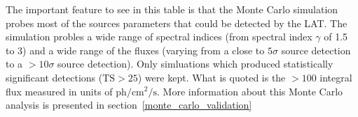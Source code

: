 \documentclass[12pt,preprint]{aastex}
\newcommand{\mev}{\text{MeV}\xspace}
\newcommand{\s}{\text{s}\xspace}
\newcommand{\ph}{\text{ph}\xspace}
\newcommand{\cm}{\text{cm}\xspace}
\newcommand{\ts}{\text{TS}\xspace}
\begin{document}
\begin{table}
\begin{centering}
{    The important feature to see in this table is that the Monte Carlo
    simulation probes most of the sources parameters that could be detected
    by the LAT.  The simulation probles a wide range of spectral indices
    (from spectral index $\gamma$ of 1.5 to 3) and a wide range of the fluxes
    (varying from a close to $5\sigma$ source detection to a $>10\sigma$
    source detection).  Only simluations which produced statistically
    significant detections ($\ts>25$) were kept.  What is quoted is the
    $>100$ \mev integral flux measured in units of $\ph/\cm^2/\s$.
    More information about this Monte Carlo analysis is presented in
    section~\ref{monte_carlo_validation}
    }
    \label{ts_ext_num_sims}
  \end{centering}
\end{table}

\clearpage
\end{document}
